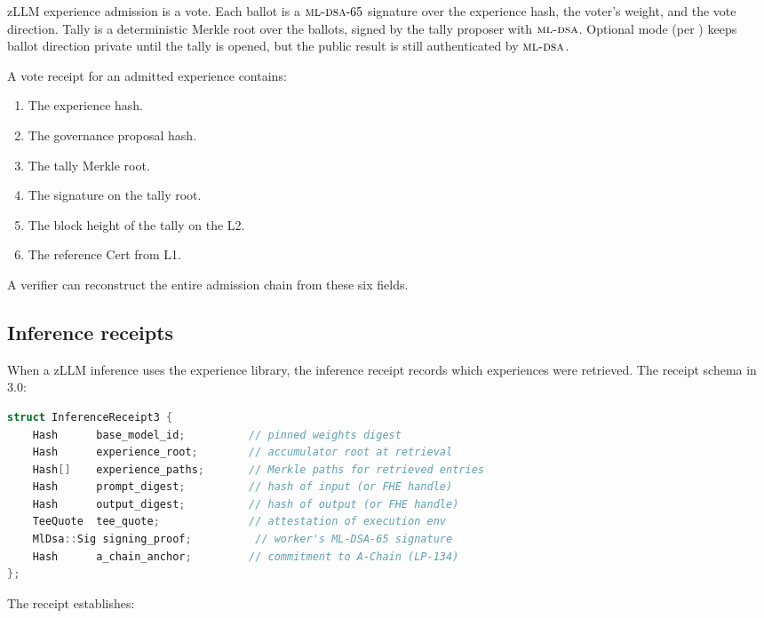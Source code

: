 zLLM experience admission is a \DAO{} vote. Each ballot is a
$\textsc{ml-dsa}{}\text{-}65$ signature over the experience hash, the voter's
weight, and the vote direction. Tally is a deterministic Merkle root
over the ballots, signed by the tally proposer with $\textsc{ml-dsa}{}$.
Optional \FHE{} mode (per \cite{zoo-2025-securities-and-dao}) keeps
ballot direction private until the tally is opened, but the public
result is still authenticated by $\textsc{ml-dsa}{}$.

A vote receipt for an admitted experience contains:

\begin{enumerate}[leftmargin=1.4em]
  \item The experience hash.
  \item The governance proposal hash.
  \item The tally Merkle root.
  \item The \MLDSA{} signature on the tally root.
  \item The block height of the tally on the L2.
  \item The reference \Quasar{}Cert from \Lux{} L1.
\end{enumerate}

A verifier can reconstruct the entire admission chain from these
six fields.

\subsection{Inference receipts}

When a zLLM inference uses the experience library, the inference
receipt records which experiences were retrieved. The receipt schema
in 3.0:

\begin{lstlisting}[language=C++,caption={3.0 inference receipt schema}]
struct InferenceReceipt3 {
    Hash      base_model_id;          // pinned weights digest
    Hash      experience_root;        // accumulator root at retrieval
    Hash[]    experience_paths;       // Merkle paths for retrieved entries
    Hash      prompt_digest;          // hash of input (or FHE handle)
    Hash      output_digest;          // hash of output (or FHE handle)
    TeeQuote  tee_quote;              // attestation of execution env
    MlDsa::Sig signing_proof;          // worker's ML-DSA-65 signature
    Hash      a_chain_anchor;         // commitment to A-Chain (LP-134)
};
\end{lstlisting}

The receipt establishes:

